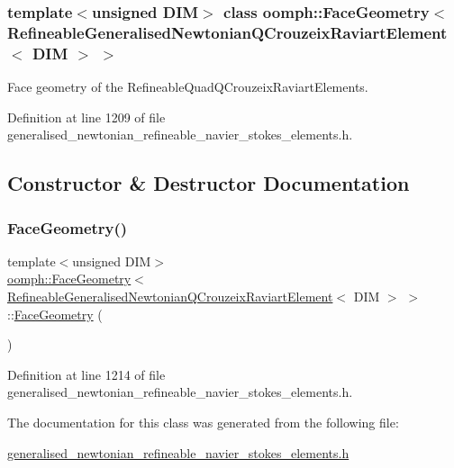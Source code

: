 \subsubsection*{template$<$unsigned D\+IM$>$\newline
class oomph\+::\+Face\+Geometry$<$ Refineable\+Generalised\+Newtonian\+Q\+Crouzeix\+Raviart\+Element$<$ D\+I\+M $>$ $>$}

Face geometry of the Refineable\+Quad\+Q\+Crouzeix\+Raviart\+Elements. 

Definition at line 1209 of file generalised\+\_\+newtonian\+\_\+refineable\+\_\+navier\+\_\+stokes\+\_\+elements.\+h.



\subsection{Constructor \& Destructor Documentation}
\mbox{\label{classoomph_1_1FaceGeometry_3_01RefineableGeneralisedNewtonianQCrouzeixRaviartElement_3_01DIM_01_4_01_4_a553676a80105e5caf521e22aa56388b2}} 
\subsubsection{\texorpdfstring{Face\+Geometry()}{FaceGeometry()}}
{\footnotesize\ttfamily template$<$unsigned D\+IM$>$ \\
\hyperlink{classoomph_1_1FaceGeometry}{oomph\+::\+Face\+Geometry}$<$ \hyperlink{classoomph_1_1RefineableGeneralisedNewtonianQCrouzeixRaviartElement}{Refineable\+Generalised\+Newtonian\+Q\+Crouzeix\+Raviart\+Element}$<$ D\+IM $>$ $>$\+::\hyperlink{classoomph_1_1FaceGeometry}{Face\+Geometry} (\begin{DoxyParamCaption}{ }\end{DoxyParamCaption})\hspace{0.3cm}{\ttfamily [inline]}}



Definition at line 1214 of file generalised\+\_\+newtonian\+\_\+refineable\+\_\+navier\+\_\+stokes\+\_\+elements.\+h.



The documentation for this class was generated from the following file\+:\begin{DoxyCompactItemize}
\item 
\hyperlink{generalised__newtonian__refineable__navier__stokes__elements_8h}{generalised\+\_\+newtonian\+\_\+refineable\+\_\+navier\+\_\+stokes\+\_\+elements.\+h}\end{DoxyCompactItemize}
